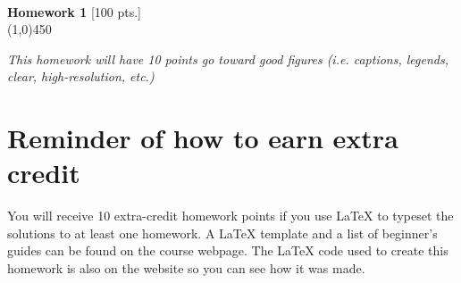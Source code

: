 
\


\begin{center}
    {\LARGE \textbf{Homework 1} [100 pts.]} \\[.1cm]%
    \line(1,0){450}
\end{center}
%

\begin{center}
\end{center}

\textit{This homework will have 10 points go toward good figures (i.e. captions, legends, clear, high-resolution, etc.)}

\section*{Reminder of how to earn extra credit}
You will receive 10 extra-credit homework points if you use {\LaTeX} to typeset the solutions to at least one homework. A {\LaTeX} template and a list of beginner's guides can be found on the course webpage. The {\LaTeX} code used to create this homework is also on the website so you can see how it was made.

%
%

